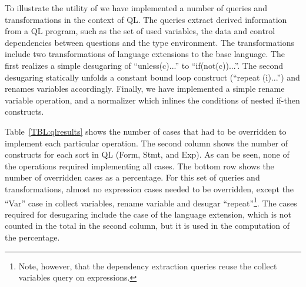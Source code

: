 To illustrate the utility of \name we have implemented a number of queries and transformations in the context of QL. The queries extract derived information from a QL program, such as the set of used variables, the data and control dependencies between questions and the type environment.
The transformations include two transformations of language extensions to the base language.
The first realizes a simple desugaring of ``unless(c){...}'' to ``if(not(c)){...}''.
The second desugaring statically unfolds a constant bound loop construct (``repeat (i){...}'') and renames variables accordingly.
Finally, we have implemented a simple rename variable operation, and a normalizer which inlines the conditions of nested if-then constructs.  

Table~\ref{TBL:qlresults} shows the number of cases that had to be overridden to implement each particular operation. The second column shows the number of  constructs for each sort in QL (Form, Stmt, and Exp).
As can be seen, none of the operations required implementing all cases.
The bottom row shows the number of overridden cases as a percentage.
For this set of queries and transformations, almost no expression cases needed to be overridden, except the ``Var'' case in collect variables, rename variable and desugar ``repeat''\footnote{Note, however, that the dependency extraction queries reuse the collect variables query on expressions.}.
The cases required for desugaring include the case of the language extension, which is not counted in the total in the second column, but it is used in the computation of the percentage. 


